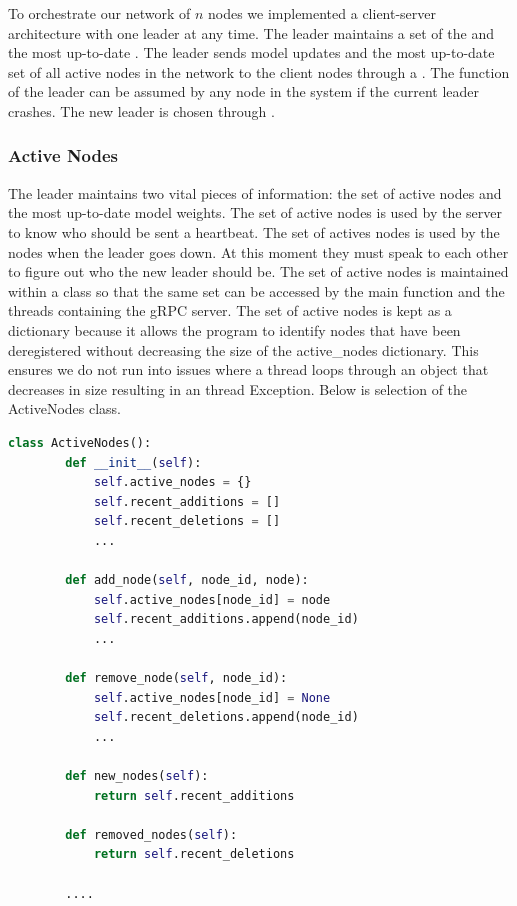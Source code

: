 \documentclass{article}
\begin{document}
To orchestrate our network of $n$ nodes we implemented a client-server architecture with one leader at any time. The leader maintains a set of the  and the most up-to-date . The leader sends model updates and the most up-to-date set of all active nodes in the network to the client nodes through a .  The function of the leader can be assumed by any node in the system if the current leader crashes. The new leader is chosen through .


\subsubsection{Active Nodes}
\label{sec:an}
The leader maintains two vital pieces of information: the set of active nodes and the most up-to-date model weights. The set of active nodes is used by the server to know who should be sent a heartbeat. The set of actives nodes is used by the nodes when the leader goes down. At this moment they must speak to each other to figure out who the new leader should be. The set of active nodes is maintained within a class so that the same set can be accessed by the main function and the threads containing the gRPC server. The set of active nodes is kept as a dictionary because it allows the program to identify nodes that have been deregistered without decreasing the size of the active\_nodes dictionary. This ensures we do not run into issues where a thread loops through an object that decreases in size resulting in an thread Exception. Below is selection of the ActiveNodes class.

\begin{lstlisting}[language=Python]
    class ActiveNodes():
        def __init__(self):
            self.active_nodes = {}
            self.recent_additions = []
            self.recent_deletions = []
            ...
        
        def add_node(self, node_id, node):
            self.active_nodes[node_id] = node
            self.recent_additions.append(node_id)
            ...

        def remove_node(self, node_id):
            self.active_nodes[node_id] = None
            self.recent_deletions.append(node_id)
            ...

        def new_nodes(self):
            return self.recent_additions
        
        def removed_nodes(self):
            return self.recent_deletions

        ....

\end{lstlisting}
\end{document}

